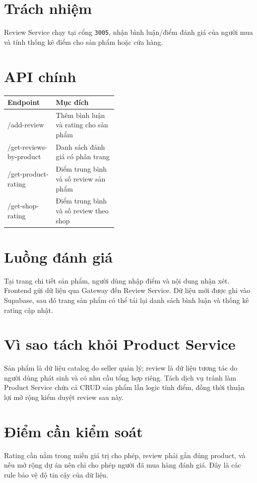 \documentclass[12pt]{article}
\begin{document}

\section{Trách nhiệm}
Review Service chạy tại cổng \texttt{3005}, nhận bình luận/điểm đánh giá của người mua và tính thống kê điểm cho sản phẩm hoặc cửa hàng.

\section{API chính}
\begin{tabularx}{\linewidth}{>{\ttfamily}p{0.44\linewidth} X}
\toprule
Endpoint & Mục đích \\
\midrule
/add-review & Thêm bình luận và rating cho sản phẩm \\
/get-reviews-by-product & Danh sách đánh giá có phân trang \\
/get-product-rating & Điểm trung bình và số review sản phẩm \\
/get-shop-rating & Điểm trung bình và số review theo shop \\
\bottomrule
\end{tabularx}

\section{Luồng đánh giá}
Tại trang chi tiết sản phẩm, người dùng nhập điểm và nội dung nhận xét. Frontend gửi dữ liệu qua Gateway đến Review Service. Dữ liệu mới được ghi vào Supabase, sau đó trang sản phẩm có thể tải lại danh sách bình luận và thống kê rating cập nhật.

\section{Vì sao tách khỏi Product Service}
Sản phẩm là dữ liệu catalog do seller quản lý; review là dữ liệu tương tác do người dùng phát sinh và có nhu cầu tổng hợp riêng. Tách dịch vụ tránh làm Product Service chứa cả CRUD sản phẩm lẫn logic tính điểm, đồng thời thuận lợi mở rộng kiểm duyệt review sau này.

\section{Điểm cần kiểm soát}
Rating cần nằm trong miền giá trị cho phép, review phải gắn đúng product, và nếu mở rộng dự án nên chỉ cho phép người đã mua hàng đánh giá. Đây là các rule bảo vệ độ tin cậy của dữ liệu.
\end{document}
